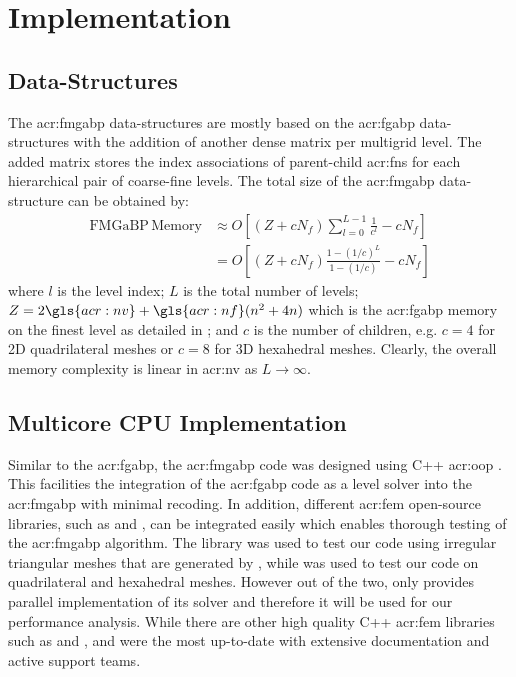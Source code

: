 \section{Implementation}
\label{sec:fmgabpImp}

\subsection{Data-Structures}

The \gls{acr:fmgabp} data-structures are mostly based on the \gls{acr:fgabp} data-structures with the addition of another dense matrix per multigrid level.
The added matrix stores the index associations of parent-child \glspl{acr:fn} for each hierarchical pair of coarse-fine levels.
The total size of the \gls{acr:fmgabp} data-structure can be obtained by:
\begin{align}
	\mathrm{FMGaBP\, Memory} & \approx O\left[ (Z+cN_f) \sum_{l=0}^{L-1} \frac{1}{c^l} - cN_f \right]\\
	& = O\left[(Z+cN_f) \frac{1-(1/c)^{L}}{1-(1/c)} - cN_f\right]
	\label{eqn:fmgabpMem}
\end{align}
where $l$ is the level index; $L$ is the total number of levels; $Z=2 \gls{acr:nv}+\gls{acr:nf}(n^2+4n)$ which is the \gls{acr:fgabp} memory on the finest level as detailed in ; and $c$ is the number of children, e.g. $c=4$ for 2D quadrilateral meshes or $c=8$ for 3D hexahedral meshes.
Clearly, the overall memory complexity is linear in \gls{acr:nv} as $L\to \infty$.

\subsection{Multicore CPU Implementation}

Similar to the \gls{acr:fgabp}, the \gls{acr:fmgabp} code was designed using C++ \gls{acr:oop} \cite{bib:c++stroustrup2013,bib:c++prata2004}.
This facilities the integration of the \gls{acr:fgabp} code as a level solver into the \gls{acr:fmgabp} with minimal recoding.
In addition, different \gls{acr:fem} open-source libraries, such as \dealName{} \cite{bib:dealii2007} and  \cite{bib:getfem}, can be integrated easily which enables thorough testing of the \gls{acr:fmgabp} algorithm.
The library  was used to test our code using irregular triangular meshes that are generated by  \cite{bib:gmsh2009}, while \dealName{} was used to test our code on quadrilateral and hexahedral meshes.
However out of the two, only \dealName{} provides parallel implementation of its solver and therefore it will be used for our performance analysis.
While there are other high quality C++ \gls{acr:fem} libraries such as  \cite{bib:dunefemwebpage,bib:dunefemwebpage} and  \cite{bib:libMesh}, \dealName{} and  were the most up-to-date with extensive documentation and active support teams.



